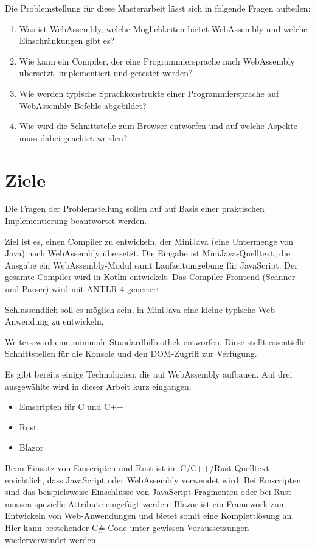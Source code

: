 Die Problemstellung für diese Masterarbeit lässt sich in folgende Fragen aufteilen:

\begin{enumerate}
	\item Was ist WebAssembly, welche Möglichkeiten bietet WebAssembly und welche Einschränkungen gibt es?
	\item Wie kann ein Compiler, der eine Programmiersprache nach WebAssembly übersetzt, implementiert und getestet werden?
	\item Wie werden typische Sprachkonstrukte einer Programmiersprache auf Web\-Assem\-bly-Befehle abgebildet?
	\item Wie wird die Schnittstelle zum Browser entworfen und auf welche Aspekte muss dabei geachtet werden?
\end{enumerate}

\section{Ziele}

Die Fragen der Problemstellung sollen auf auf Basis einer praktischen Implementierung beantwortet werden.

Ziel ist es, einen Compiler zu entwickeln, der MiniJava (eine Untermenge von Java) nach WebAssembly übersetzt. Die Eingabe ist MiniJava-Quelltext, die Ausgabe ein WebAssembly-Modul samt Laufzeitumgebung für JavaScript. Der gesamte Compiler wird in Kotlin entwickelt. Das Compiler-Frontend (Scanner und Parser) wird mit ANTLR 4 generiert.

Schlussendlich soll es möglich sein, in MiniJava eine kleine typische Web-Anwendung zu entwickeln.

Weiters wird eine minimale Standardbilbiothek entworfen. Diese stellt essentielle Schnittstellen für die Konsole und den DOM-Zugriff zur Verfügung.

Es gibt bereits einige Technologien, die auf WebAssembly aufbauen. Auf drei ausgewählte wird in dieser Arbeit kurz eingangen:
\begin{itemize}
    \item Emscripten \cite{Emscripten} für C und C++
    \item Rust \cite{RustWasmWebsite}
    \item Blazor \cite{Blazor}
\end{itemize}

Beim Einsatz von Emscripten und Rust ist im C/C++/Rust-Quelltext ersichtlich, dass JavaScript oder WebAssembly verwendet wird. Bei Emscripten sind das beispielsweise Einschlüsse von JavaScript-Fragmenten oder bei Rust müssen spezielle Attribute eingefügt werden. Blazor ist ein Framework zum Entwickeln von Web-Anwendungen und bietet somit eine Komplettlösung an. Hier kann bestehender C\#{}-Code unter gewissen Voraussetzungen wiederverwendet werden.

